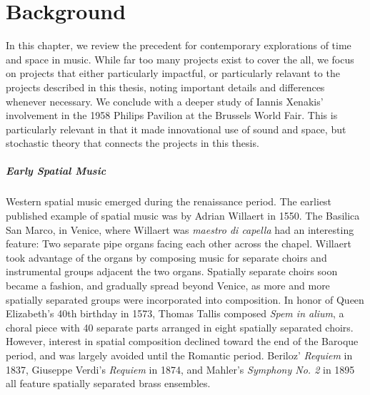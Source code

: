 \clearpage
\chapter{Background}
\label{ch:background}
In this chapter, we review the precedent for contemporary explorations of
time and space in music. While far too many projects exist to cover
the all, we focus on projects that either particularly impactful, or
particularly relavant to the projects described in this thesis, noting
important details and differences whenever necessary. We conclude with
a deeper study of Iannis Xenakis' involvement in the 1958 Philips
Pavilion at the Brussels World Fair. This is particularly relevant in
that it made innovational use of sound and space, but stochastic
theory that connects the projects in this thesis. 

\paragraph{Early Spatial Music} Western spatial music emerged during
the renaissance period. The earliest published example of spatial
music was by Adrian Willaert in 1550.\cite{Zvonar1999} The Basilica
San Marco, in Venice, where Willaert was \textit{maestro di capella}
had an interesting feature: Two separate pipe organs facing each other
across the chapel. Willaert took advantage of the organs by composing
music for separate choirs and instrumental groups adjacent the two
organs. Spatially separate choirs soon became a fashion, and gradually
spread beyond Venice, as more and more spatially separated groups were
incorporated into composition. In honor of Queen Elizabeth's 40th
birthday in 1573, Thomas Tallis composed \textit{Spem in alium}, a
choral piece with 40 separate parts arranged in eight spatially
separated choirs. However, interest in spatial composition declined
toward the end of the Baroque period, and was largely avoided until
the Romantic period. Beriloz' \textit{Requiem} in 1837, Giuseppe
Verdi's \textit{Requiem} in 1874, and Mahler's \textit{Symphony No. 2}
in 1895 all feature spatially separated brass ensembles.

